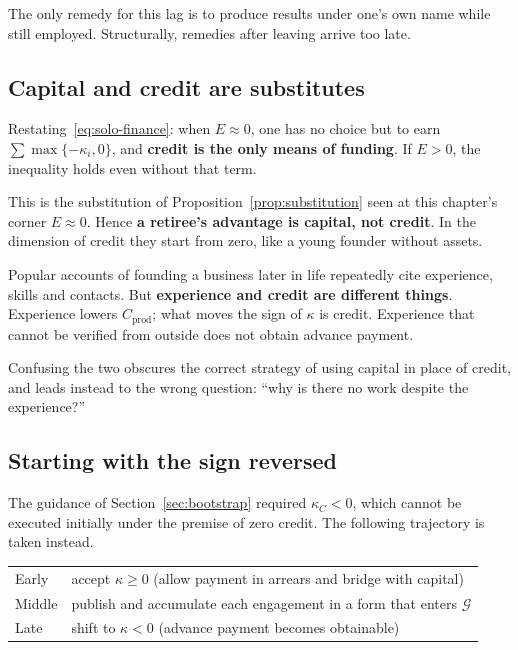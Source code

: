 The only remedy for this lag is to produce results under one's own name while still employed.
Structurally, remedies after leaving arrive too late.

\subsection{Capital and credit are substitutes}

Restating~\eqref{eq:solo-finance}: when $E\approx 0$, one has no choice but to earn
$\sum\max\{-\kappa_i,0\}$, and \textbf{credit is the only means of funding}. If $E>0$, the
inequality holds even without that term.

This is the substitution of Proposition~\ref{prop:substitution} seen at this chapter's corner
$E\approx 0$. Hence \textbf{a retiree's advantage is capital, not credit}. In the dimension
of credit they start from zero, like a young founder without assets.

\begin{remark}
Popular accounts of founding a business later in life repeatedly cite experience, skills and
contacts. But \textbf{experience and credit are different things}. Experience lowers
$C_{\mathrm{prod}}$; what moves the sign of $\kappa$ is credit. Experience that cannot be
verified from outside does not obtain advance payment.

Confusing the two obscures the correct strategy of using capital in place of credit, and
leads instead to the wrong question: ``why is there no work despite the experience?''
\end{remark}

\subsection{Starting with the sign reversed}

The guidance of Section~\ref{sec:bootstrap} required $\kappa_C<0$, which cannot be executed
initially under the premise of zero credit. The following trajectory is taken instead.

\begin{center}
\begin{tabularx}{\textwidth}{@{}lX@{}}
\toprule
Early & accept $\kappa\geq 0$ (allow payment in arrears and bridge with capital) \\
Middle & publish and accumulate each engagement in a form that enters $\mathcal{G}$ \\
Late & shift to $\kappa<0$ (advance payment becomes obtainable) \\
\bottomrule
\end{tabularx}
\label{tab:solo-credit-trajectory}
\end{center}

